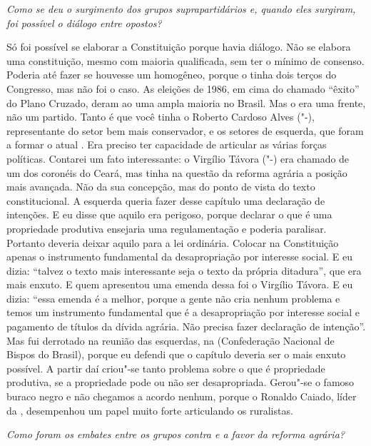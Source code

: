 \noindent\emph{Como se deu o surgimento dos grupos suprapartidários e, quando
eles surgiram, foi possível o diálogo entre opostos?}

Só foi possível se elaborar a Constituição porque havia
diálogo. Não se elabora uma constituição, mesmo com maioria qualificada,
sem ter o mínimo de consenso. Poderia até fazer se houvesse um 
homogêneo, porque o  tinha dois terços do Congresso, mas não foi o
caso. As eleições de 1986, em cima do chamado ``êxito'' do Plano
Cruzado, deram ao  uma ampla maioria no Brasil. Mas o  era uma
frente, não um partido. Tanto é que você tinha o Roberto Cardoso Alves
("-), representante do setor bem mais conservador, e os setores de
esquerda, que foram a formar o atual . Era preciso ter capacidade de
articular as várias forças políticas. Contarei um fato interessante: o
Virgílio Távora ("-) era chamado de um dos coronéis do Ceará, mas
tinha na questão da reforma agrária a posição mais avançada. Não da sua
concepção, mas do ponto de vista do texto constitucional. A esquerda
queria fazer desse capítulo uma declaração de intenções. E eu disse que
aquilo era perigoso, porque declarar o que é uma propriedade produtiva
ensejaria uma regulamentação e poderia paralisar. Portanto deveria
deixar aquilo para a lei ordinária. Colocar na Constituição apenas o
instrumento fundamental da desapropriação por interesse social. E eu
dizia: ``talvez o texto mais interessante seja o texto da própria
ditadura'', que era mais enxuto. E quem apresentou uma emenda dessa foi
o Virgílio Távora. E eu dizia: ``essa emenda é a melhor, porque a gente
não cria nenhum problema e temos um instrumento fundamental que é a
desapropriação por interesse social e pagamento de títulos da dívida
agrária. Não precisa fazer declaração de intenção''. Mas fui derrotado
na reunião das esquerdas, na  (Confederação Nacional de Bispos do
Brasil), porque eu defendi que o capítulo deveria ser o mais enxuto
possível. A partir daí criou"-se tanto problema sobre o que é propriedade
produtiva, se a propriedade pode ou não ser desapropriada. Gerou"-se o
famoso buraco negro e não chegamos a acordo nenhum, porque o Ronaldo
Caiado, líder da , desempenhou um papel muito forte articulando os
ruralistas.

\medskip

\noindent\emph{Como foram os embates entre os grupos contra e a favor da
reforma agrária?}


